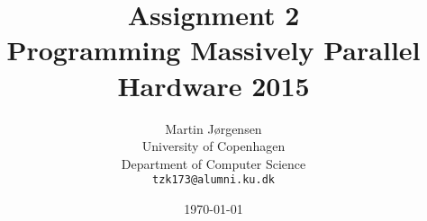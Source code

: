 \documentclass[a4paper,11pt]{article}
\title{\textbf{Assignment 2} \\ Programming Massively Parallel Hardware 2015}
\author
{
    Martin Jørgensen \\
    University of Copenhagen \\
    Department of Computer Science \\
    {\tt tzk173@alumni.ku.dk}
}
\date{\today}
\begin{document}
\maketitle

\tableofcontents
\pagebreak


%






\appendix


\end{document}

